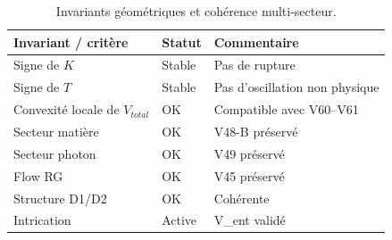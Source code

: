 \begin{table}[htbp]
\centering
\caption{Invariants géométriques et cohérence multi-secteur.}
\begin{tabular}{>{\raggedright\arraybackslash}p{5cm} >{\centering\arraybackslash}p{3cm} >{\raggedright\arraybackslash}p{4cm}}
\toprule
Invariant / critère & Statut & Commentaire \\
\midrule
Signe de $K$ & Stable & Pas de rupture \\
Signe de $T$ & Stable & Pas d'oscillation non physique \\
Convexité locale de $V_{total}$ & OK & Compatible avec V60--V61 \\
Secteur matière & OK & V48-B préservé \\
Secteur photon & OK & V49 préservé \\
Flow RG & OK & V45 préservé \\
Structure D1/D2 & OK & Cohérente \\
Intrication & Active & V\_ent validé \\
\bottomrule
\end{tabular}
\end{table}